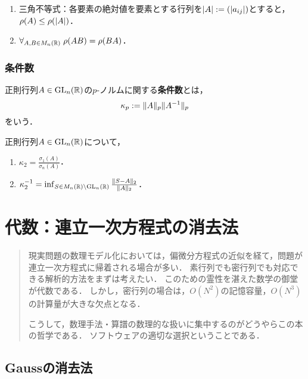 \documentclass[uplatex, dvipdfmx]{jsreport}
\begin{document}
\begin{lemma}\mbox{}
    \begin{enumerate}
        \item 三角不等式：各要素の絶対値を要素とする行列を$\lvert A\rvert:=(\lvert a_{ij}\rvert)$とすると，$\rho(A)\le\rho(\lvert A\rvert)$．
        \item $\forall_{A,B\in M_n(\mathbb{R})}\;\rho(AB)=\rho(BA)$．
    \end{enumerate}
\end{lemma}

\subsection{条件数}

\begin{definition}
    正則行列$A\in\mathrm{GL}_n(\mathbb{R})$の$p$-ノルムに関する\textbf{条件数}とは，
    \[\kappa_p:=\|A\|_p\|A^{-1}\|_p\]
    をいう．
\end{definition}

\begin{lemma}
    正則行列$A\in\mathrm{GL}_n(\mathbb{R})$について，
    \begin{enumerate}
        \item $\kappa_2=\frac{\sigma_1(A)}{\sigma_n(A)}$．
        \item $\kappa_2^{-1}=\inf_{S\in M_n(\mathbb{R})\setminus\mathrm{GL}_n(\mathbb{R})}\frac{\|S-A\|_2}{\|A\|_2}$．
    \end{enumerate}
\end{lemma}

\chapter{代数：連立一次方程式の消去法}

\begin{quotation}
    現実問題の数理モデル化においては，偏微分方程式の近似を経て，問題が連立一次方程式に帰着される場合が多い．
    素行列でも密行列でも対応できる解析的方法をまずは考えたい．
    このための霊性を湛えた数学の御堂が代数である．
    しかし，密行列の場合は，$O(N^2)$の記憶容量，$O(N^3)$の計算量が大きな欠点となる．

    こうして，数理手法・算譜の数理的な扱いに集中するのがどうやらこの本の哲学である．
    ソフトウェアの適切な選択ということである．
\end{quotation}


\section{Gaussの消去法}
\end{document}
